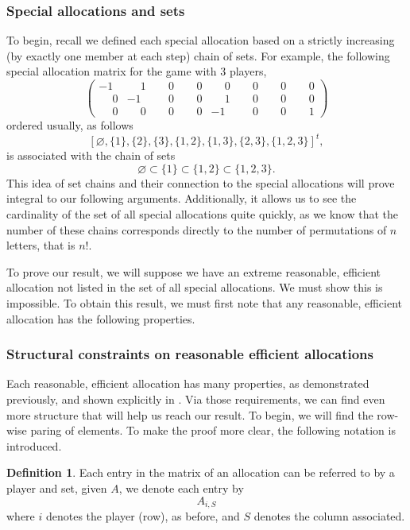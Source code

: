 \documentclass[12pt,letterpaper,final]{article}
\theoremstyle{plain}
\theoremstyle{plain}
\theoremstyle{plain}
\theoremstyle{plain}
\theoremstyle{plain}
\theoremstyle{plain}
\theoremstyle{plain}
\theoremstyle{definition}
\newtheorem{definition}{Definition}[section]
\theoremstyle{definition}
\theoremstyle{definition}
\theoremstyle{definition}
\theoremstyle{definition}
\theoremstyle{remark}
\theoremstyle{remark}
\theoremstyle{remark}
\theoremstyle{remark}
\newcommand{\p}{\phantom{-}}
\begin{document}
\subsubsection{Special allocations and sets}
\label{sec:saav-sets}

To begin, recall we defined each special allocation based on a
strictly increasing (by exactly one member at each step) chain of
sets. For example, the
following special allocation matrix for the game with \(3\) players,
\[
  \begin{pmatrix}
    -1&\p1&\p0&\p0&\p0&\p0&\p0&\p0\\
    \p0&-1&\p0&\p0&\p1&\p0&\p0&\p0\\
    \p0&\p0&\p0&\p0&-1&\p0&\p0&\p1
  \end{pmatrix}
\]
ordered usually, as follows
\[
  {\left[
    \varnothing , \{1\}, \{2\}, \{3\}, \{1,2\}, \{1,3\}, \{2,3\}, \{1,2,3\}
  \right]}^t,
\]
is associated with the chain of sets
\begin{equation*}
  \varnothing \subset \{1\} \subset \{1,2\} \subset \{1,2,3\}.
\end{equation*}
This idea of set chains and their connection to the special allocations will prove
integral to our following arguments. 
Additionally, it allows us to see the cardinality of the set of all
special allocations quite
quickly, as we know that the number of these chains corresponds
directly to the number of permutations of \(n\) letters, that is \(n!\).%

To prove our result, we will suppose we have an extreme reasonable,
efficient allocation not
listed in the set of all special allocations. We 
must show this is impossible. To obtain this result, we must first
note that 
any reasonable, efficient allocation has the following properties.

\subsubsection{Structural constraints on reasonable efficient allocations}

Each reasonable, efficient allocation has many properties, as
demonstrated previously, and shown explicitly in
\cite{ClarkDis}. Via those requirements, we
can find even 
more structure that will help us reach our result. To begin, we
will find the row-wise paring of elements. To make the proof more clear, the
following notation is introduced. 

\begin{definition}\label{def:matrixEntries} 
  Each entry in the matrix of an allocation can be referred
  to by a player and set, given \(A\),  we denote each entry by
  \[
    A_{i,S}
  \]
  where \(i\) denotes the player (row), as before, and \(S\) denotes
  the column associated.
\end{definition}
\end{document}
